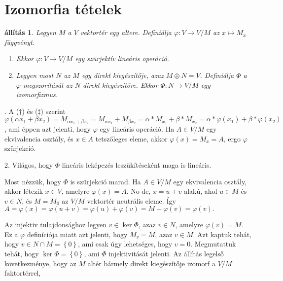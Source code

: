 \documentclass[a4paper, showtrims]{memoir}
\makeatletter
\renewenvironment{proof}[1][\proofname]
    {\par\pushQED{\qed}%
    \normalfont \topsep6\p@\@plus6\p@\relax
    \trivlist
    \item[\hskip\labelsep
        \itshape
    #1\@addpunct{:}]\ignorespaces}
    {\popQED\endtrivlist\@endpefalse}
\theoremstyle{plain}
\newtheorem{proposition}{állítás}[chapter]
\theoremstyle{remark}
\theoremstyle{definition}
\makeatother
\begin{document}
\section{Izomorfia tételek}
\begin{proposition}
	Legyen $M$ a $V$ vektortér egy altere.
	Definiálja $\varphi:V\to V/M$ az $x\mapsto M_x$ függvényt.
	\begin{enumerate}
		\item Ekkor $\varphi:V\to V/M$ egy szürjektív lineáris operáció.
		\item Legyen most $N$ az $M$ egy direkt kiegészítője,
		      azaz $M\oplus N=V$.
		      Definiálja $\Phi$ a $\varphi$ megszorítását az $N$ direkt kiegészítőre.
		      Ekkor $\Phi:N\to V/M$ egy izomorfizmus.\qedhere
	\end{enumerate}
\end{proposition}
\begin{proof}
	1. A ($\dag$) és ($\ddag$) szerint
	$
		\varphi\left( \alpha x_1+\beta x_2 \right)
		=
		M_{\alpha x_1+\beta x_2}
		=
		M_{\alpha x_1}+M_{\beta x_2}
		=
		\alpha\ast M_{x_1}+\beta\ast M_{x_2}
		=
		\alpha\ast\varphi\left( x_1 \right)+\beta\ast\varphi\left( x_2 \right)
	$,
	ami éppen azt jelenti, hogy $\varphi$ egy lineáris operáció.
	Ha $A\in V/M$ egy ekvivalencia osztály, és $x\in A$ tetszőleges eleme,
	akkor $\varphi\left( x \right)=M_x=A$, ergo $\varphi$ szürjekció.

	2. Világos, hogy $\Phi$ lineáris leképezés leszűkítéseként maga is lineáris.

	Most nézzük, hogy $\Phi$ is szürjekció marad.
	Ha $A\in V/M$ egy ekvivalencia osztály,
	akkor létezik $x\in V$, amelyre $\varphi\left( x \right)=A$.
	No de, $x=u+v$ alakú, ahol $u\in M$ és $v\in N$, és $M=M_0$ az $V/M$ vektortér neutrális eleme.
	Így
	$
		A=\varphi\left( x \right)=\varphi\left( u+v \right)=\varphi\left( u \right)+\varphi\left( v \right)
		=M+\varphi\left( v \right)=\varphi\left( v \right).
	$

	Az injektiv tulajdonsághoz legyen $v\in \ker\Phi$,
	azaz $v\in N$, amelyre $\varphi\left( v \right)=M$.
	Ez a $\varphi$ definíciója miatt azt jelenti, hogy $M_v=M$, azaz $v\in M$.
	Azt kaptuk tehát, hogy $v\in N\cap M=\left\{ 0 \right\}$,
	ami csak úgy lehetséges,
	hogy $v=0$.
	Megmutattuk tehát, hogy $\ker\Phi=\left\{ 0 \right\}$,
	ami $\Phi$ injektivitását jelenti.
\end{proof}
Az állítás legelső következménye,
hogy az $M$ altér bármely direkt kiegészítője izomorf a $V/M$ faktortérrel,
\end{document}
